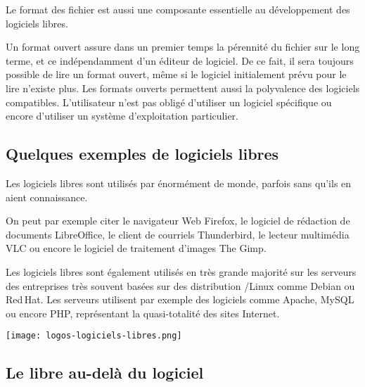 Le format des fichier est aussi une composante essentielle au développement des logiciels libres.

Un \textcolor{Cdl}{format ouvert} assure dans un premier temps la pérennité du fichier sur le long terme, et ce indépendamment d’un éditeur de logiciel. De ce fait, il sera toujours possible de lire un format ouvert, même si le logiciel initialement prévu pour le lire n’existe plus. Les formats ouverts permettent aussi la polyvalence des logiciels compatibles. L’utilisateur n’est pas obligé d’utiliser un logiciel spécifique ou encore d’utiliser un système d’exploitation particulier.

\subsection{Quelques exemples de logiciels libres}

\begin{minipage}{0.7\textwidth}
Les logiciels libres sont utilisés par énormément de monde, parfois 
sans qu’ils en aient connaissance.

On peut par exemple citer le navigateur Web \textcolor{Cdl}{Firefox}, 
le logiciel de rédaction de documents \textcolor{Cdl}{LibreOffice}, le 
client de courriels \textcolor{Cdl}{Thunderbird}, le lecteur 
multimédia \textcolor{Cdl}{VLC} ou encore le logiciel de traitement 
d’images \textcolor{Cdl}{The Gimp}.

\Separateur

Les logiciels libres sont également utilisés en très grande majorité sur 
les serveurs des entreprises très souvent basées sur des distribution 
/Linux comme \textcolor{Cdl}{Debian} ou 
\textcolor{Cdl}{Red\,Hat}. Les serveurs utilisent par exemple des 
logiciels comme \textcolor{Cdl}{Apache}, \textcolor{Cdl}{MySQL} ou 
encore \textcolor{Cdl}{PHP}, représentant la quasi-totalité des sites 
Internet.
\end{minipage}
\begin{minipage}{0.3\textwidth}
\begin{center}
\texttt{[image: logos-logiciels-libres.png]}
\end{center}
\end{minipage}

\subsection{Le libre au-delà du logiciel}

